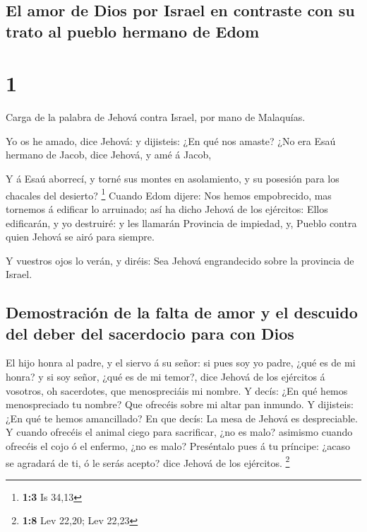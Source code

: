 \hypertarget{el-amor-de-dios-por-israel-en-contraste-con-su-trato-al-pueblo-hermano-de-edom}{%
\subsection{El amor de Dios por Israel en contraste con su trato al
pueblo hermano de
Edom}\label{el-amor-de-dios-por-israel-en-contraste-con-su-trato-al-pueblo-hermano-de-edom}}

\hypertarget{section}{%
\section{1}\label{section}}

 Carga de la palabra de Jehová contra Israel, por mano de
Malaquías.

 Yo os he amado, dice Jehová: y dijisteis: ¿En qué nos
amaste? ¿No era Esaú hermano de Jacob, dice Jehová, y amé á Jacob,

 Y á Esaú aborrecí, y torné sus montes en asolamiento, y su
posesión para los chacales del desierto? \footnote{\textbf{1:3} Is 34,13}
 Cuando Edom dijere: Nos hemos empobrecido, mas tornemos á
edificar lo arruinado; así ha dicho Jehová de los ejércitos: Ellos
edificarán, y yo destruiré: y les llamarán Provincia de impiedad, y,
Pueblo contra quien Jehová se airó para siempre.

 Y vuestros ojos lo verán, y diréis: Sea Jehová engrandecido
sobre la provincia de Israel.

\hypertarget{demostraciuxf3n-de-la-falta-de-amor-y-el-descuido-del-deber-del-sacerdocio-para-con-dios}{%
\subsection{Demostración de la falta de amor y el descuido del deber del
sacerdocio para con
Dios}\label{demostraciuxf3n-de-la-falta-de-amor-y-el-descuido-del-deber-del-sacerdocio-para-con-dios}}

 El hijo honra al padre, y el siervo á su señor: si pues soy
yo padre, ¿qué es de mi honra? y si soy señor, ¿qué es de mi temor?,
dice Jehová de los ejércitos á vosotros, oh sacerdotes, que
menospreciáis mi nombre. Y decís: ¿En qué hemos menospreciado tu nombre?
 Que ofrecéis sobre mi altar pan inmundo. Y dijisteis: ¿En
qué te hemos amancillado? En que decís: La mesa de Jehová es
despreciable.  Y cuando ofrecéis el animal ciego para
sacrificar, ¿no es malo? asimismo cuando ofrecéis el cojo ó el enfermo,
¿no es malo? Preséntalo pues á tu príncipe: ¿acaso se agradará de ti, ó
le serás acepto? dice Jehová de los ejércitos. \footnote{\textbf{1:8}
  Lev 22,20; Lev 22,23}

